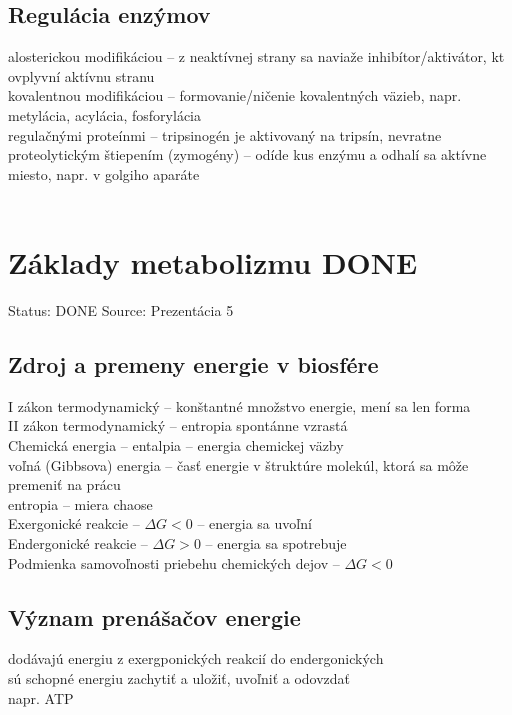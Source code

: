 \subsection{Regulácia enzýmov}
alosterickou modifikáciou -- z neaktívnej strany sa naviaže inhibítor/aktivátor, kt ovplyvní aktívnu stranu\\
kovalentnou modifikáciou -- formovanie/ničenie kovalentných väzieb, napr. metylácia, acylácia, fosforylácia\\
regulačnými proteínmi -- tripsinogén je aktivovaný na tripsín, nevratne\\
proteolytickým štiepením (zymogény) -- odíde kus enzýmu a odhalí sa aktívne miesto, napr. v golgiho aparáte\\
\\
\section{Základy metabolizmu DONE}

Status: DONE
Source: Prezentácia 5

\subsection{Zdroj a premeny energie v biosfére}
I zákon termodynamický -- konštantné množstvo energie, mení sa len forma\\
II zákon termodynamický -- entropia spontánne vzrastá\\
Chemická energia -- entalpia -- energia chemickej väzby\\
voľná (Gibbsova) energia -- časť energie v štruktúre molekúl, ktorá sa môže premeniť na prácu\\
entropia -- miera chaose\\
Exergonické reakcie -- $\Delta G < 0$ -- energia sa uvoľní\\
Endergonické reakcie -- $\Delta G> 0$ -- energia sa spotrebuje\\
Podmienka samovoľnosti priebehu chemických dejov -- $\Delta G < 0$\\
\subsection{Význam prenášačov energie}
dodávajú energiu z exergponických reakcií do endergonických\\
sú schopné energiu zachytiť a uložiť, uvoľniť a odovzdať\\
napr. ATP\\
